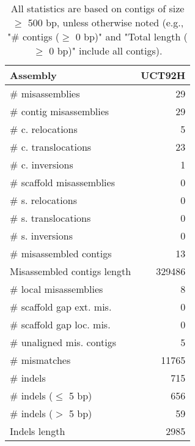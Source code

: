 \documentclass[12pt,a4paper]{article}
\begin{document}
\begin{table}[ht]
\begin{center}
\caption{All statistics are based on contigs of size $\geq$ 500 bp, unless otherwise noted (e.g., "\# contigs ($\geq$ 0 bp)" and "Total length ($\geq$ 0 bp)" include all contigs).}
\begin{tabular}{|l*{1}{|r}|}
\hline
Assembly & UCT92H \\ \hline
\# misassemblies & 29 \\ \hline
\hspace{2mm}\# contig misassemblies & 29 \\ \hline
\hspace{5mm}\# c. relocations & 5 \\ \hline
\hspace{5mm}\# c. translocations & 23 \\ \hline
\hspace{5mm}\# c. inversions & 1 \\ \hline
\hspace{2mm}\# scaffold misassemblies & 0 \\ \hline
\hspace{5mm}\# s. relocations & 0 \\ \hline
\hspace{5mm}\# s. translocations & 0 \\ \hline
\hspace{5mm}\# s. inversions & 0 \\ \hline
\# misassembled contigs & 13 \\ \hline
Misassembled contigs length & 329486 \\ \hline
\# local misassemblies & 8 \\ \hline
\# scaffold gap ext. mis. & 0 \\ \hline
\# scaffold gap loc. mis. & 0 \\ \hline
\# unaligned mis. contigs & 5 \\ \hline
\# mismatches & 11765 \\ \hline
\# indels & 715 \\ \hline
\hspace{5mm}\# indels ($\leq$ 5 bp) & 656 \\ \hline
\hspace{5mm}\# indels ($>$ 5 bp) & 59 \\ \hline
Indels length & 2985 \\ \hline
\end{tabular}
\end{center}
\end{table}
\end{document}
